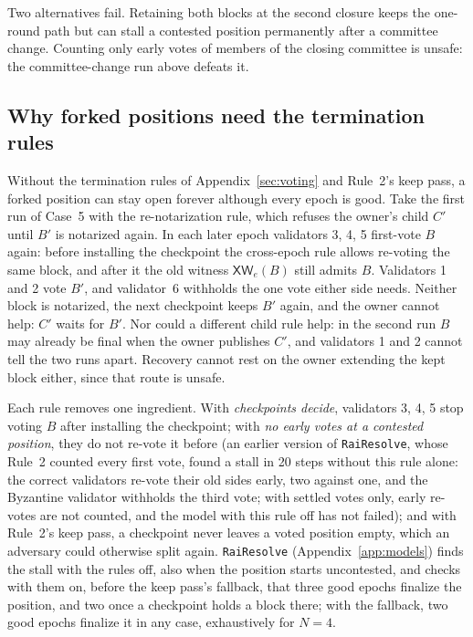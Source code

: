 \documentclass[conference]{IEEEtran}
\newcommand{\XW}{\mathsf{XW}}
\begin{document}
Two alternatives fail. Retaining both blocks at the second closure keeps the one-round path but can stall a contested position permanently after a committee change. Counting only early votes of members of the closing committee is unsafe: the committee-change run above defeats it.

\subsection{Why forked positions need the termination rules}
\label{app:stall}
Without the termination rules of Appendix~\ref{sec:voting} and Rule~2's keep pass, a forked position can stay open forever although every epoch is good. Take the first run of Case~5 with the re-notarization rule, which refuses the owner's child $C'$ until $B'$ is notarized again. In each later epoch validators 3, 4, 5 first-vote $B$ again: before installing the checkpoint the cross-epoch rule allows re-voting the same block, and after it the old witness $\XW_e(B)$ still admits $B$. Validators 1 and 2 vote $B'$, and validator~6 withholds the one vote either side needs. Neither block is notarized, the next checkpoint keeps $B'$ again, and the owner cannot help: $C'$ waits for $B'$. Nor could a different child rule help: in the second run $B$ may already be final when the owner publishes $C'$, and validators 1 and 2 cannot tell the two runs apart. Recovery cannot rest on the owner extending the kept block either, since that route is unsafe.

Each rule removes one ingredient. With \emph{checkpoints decide}, validators 3, 4, 5 stop voting $B$ after installing the checkpoint; with \emph{no early votes at a contested position}, they do not re-vote it before (an earlier version of \texttt{RaiResolve}, whose Rule~2 counted every first vote, found a stall in 20 steps without this rule alone: the correct validators re-vote their old sides early, two against one, and the Byzantine validator withholds the third vote; with settled votes only, early re-votes are not counted, and the model with this rule off has not failed); and with Rule~2's keep pass, a checkpoint never leaves a voted position empty, which an adversary could otherwise split again. \texttt{RaiResolve} (Appendix~\ref{app:models}) finds the stall with the rules off, also when the position starts uncontested, and checks with them on, before the keep pass's fallback, that three good epochs finalize the position, and two once a checkpoint holds a block there; with the fallback, two good epochs finalize it in any case, exhaustively for $N=4$.
\end{document}
